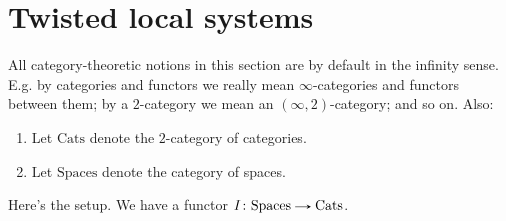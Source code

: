 
\section{Twisted local systems}

\renewcommand{\Cats}{\mathrm{Cats}}
\renewcommand{\Spaces}{\mathrm{Spaces}}

\begin{notation}
  All category-theoretic notions in this section are by default in the
  infinity sense. E.g. by categories and functors we
  really mean $\infty$-categories and functors between them; by a
  $2$-category we mean an $(\infty,2)$-category; and so on. Also:
  \begin{enumerate}
  \item Let $\Cats$ denote the $2$-category of categories.
  \item Let $\Spaces$ denote the category of spaces.
  \end{enumerate}
\end{notation}

\begin{situation}
  Here's the setup. We have a functor $I \c \Spaces \to \Cats$.
\end{situation}






